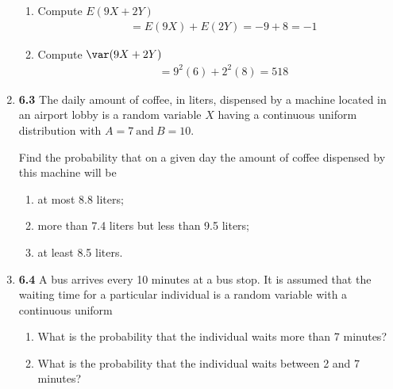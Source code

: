 \documentclass[basic, header]{nosvagor-notes}
\begin{document}
\begin{enumerate}[leftmargin=1.5em, itemsep=2em]
\begin{enumerate}[leftmargin=1.6em]
      \item Compute \(E(9X + 2Y)\)
        \begin{align*}
          &= E(9X) + E(2Y) = -9 + 8 = \boxed{-1}
        \end{align*}

      \item Compute \(\var(9X + 2Y)\)
        \begin{align*}
          &= 9^2(6) + 2^2(8) = \boxed{518}
        \end{align*}

    \end{enumerate}

  \newpage %

  \item \textbf{6.3} The daily amount of coffee, in liters, dispensed by a
    machine located in an airport lobby is a random variable \(X\) having a
    continuous uniform distribution with \(A = 7 ~\text{and}~ B = 10\).

    Find the probability that on a given day the amount of coffee dispensed by
    this machine will be
    \begin{enumerate}[leftmargin=1.6em]

      \item at most 8.8 liters;

      \item more than 7.4 liters but less than 9.5 liters;

      \item at least 8.5 liters.

    \end{enumerate}

  \item \textbf{6.4} A bus arrives every 10 minutes at a bus stop. It is
    assumed that the waiting time for a particular individual is a random
    variable with a continuous uniform
    \begin{enumerate}[leftmargin=1.6em]

      \item What is the probability that the individual waits more than 7
        minutes?

      \item  What is the probability that the individual waits between 2 and 7
        minutes?

    \end{enumerate}

\end{enumerate}
\end{document}
